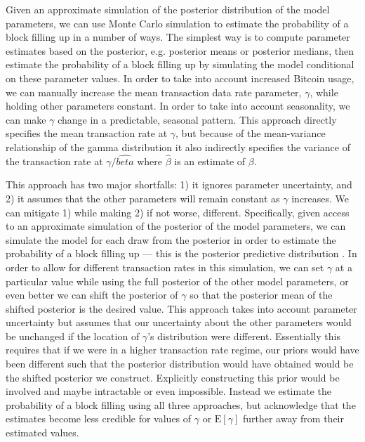 \documentclass{article}
\begin{document}
Given an approximate simulation of the posterior distribution of the model parameters, we can use Monte Carlo simulation to estimate the probability of a block filling up in a number of ways. The simplest way is to compute parameter estimates based on the posterior, e.g. posterior means or posterior medians, then estimate the probability of a block filling up by simulating the model conditional on these parameter values. In order to take into account increased Bitcoin usage, we can manually increase the mean transaction data rate parameter, $\gamma$, while holding other parameters constant. In order to take into account seasonality, we can make $\gamma$ change in a predictable, seasonal pattern. This approach directly specifies the mean transaction rate at $\gamma$, but because of the mean-variance relationship of the gamma distribution it also indirectly specifies the variance of the transaction rate at $\gamma/\hat{beta}$ where $\hat{\beta}$ is an estimate of $\beta$.

This approach has two major shortfalls: 1) it ignores parameter uncertainty, and 2) it assumes that the other parameters will remain constant as $\gamma$ increases. We can mitigate 1) while making 2) if not worse, different. Specifically, given access to an approximate simulation of the posterior of the model parameters, we can simulate the model for each draw from the posterior in order to estimate the probability of a block filling up --- this is the posterior predictive distribution \citep{gelman2014bayesian}. In order to allow for different transaction rates in this simulation, we can set $\gamma$ at a particular value while using the full posterior of the other model parameters, or even better we can shift the posterior of $\gamma$ so that the posterior mean of the shifted posterior is the desired value. This approach takes into account parameter uncertainty but assumes that our uncertainty about the other parameters would be unchanged if the location of $\gamma$'s distribution were different. Essentially this requires that if we were in a higher transaction rate regime, our priors would have been different such that the posterior distribution would have obtained would be the shifted posterior we construct. Explicitly constructing this prior would be involved and maybe intractable or even impossible. Instead we estimate the probability of a block filling using all three approaches, but acknowledge that the estimates become less credible for values of $\gamma$ or $\mathrm{E}[\gamma]$ further away from their estimated values.
\end{document}
